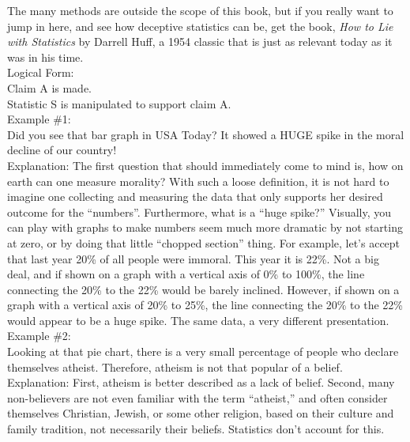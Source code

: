 \documentclass[a4paper,12pt,single,pdftex]{scrartcl}
\begin{document}
    
      The many methods are outside the scope of this book, but if you really want to jump in here, and see how deceptive statistics can be, get the book, {\it How to Lie with Statistics} by Darrell Huff, a 1954 classic that is just as relevant today as it was in his time.
    \\

    
      Logical Form:
    \\

    
      Claim A is made.
    \\

    
      Statistic S is manipulated to support claim A.
    \\

    
      Example \#1:
    \\

    
      Did you see that bar graph in USA Today?  It showed a HUGE spike in the moral decline of our country!
    \\

    
      Explanation: The first question that should immediately come to mind is, how on earth can one measure morality?  With such a loose definition, it is not hard to imagine one collecting and measuring the data that only supports her desired outcome for the “numbers”.  Furthermore, what is a “huge spike?”  Visually, you can play with graphs to make numbers seem much more dramatic by not starting at zero, or by doing that little “chopped section” thing.  For example, let’s accept that last year 20\% of all people were immoral.  This year it is 22\%.  Not a big deal, and if shown on a graph with a vertical axis of 0\% to 100\%, the line connecting the 20\% to the 22\% would be barely inclined.  However, if shown on a graph with a vertical axis of 20\% to 25\%, the line connecting the 20\% to the 22\% would appear to be a huge spike. The same data, a very different presentation.
    \\

    
      Example \#2:
    \\

    
      Looking at that pie chart, there is a very small percentage of people who declare themselves atheist.  Therefore, atheism is not that popular of a belief.
    \\

    
      Explanation: First, atheism is better described as a lack of belief.  Second, many non-believers are not even familiar with the term “atheist,” and often consider themselves Christian, Jewish, or some other religion, based on their culture and family tradition, not necessarily their beliefs.  Statistics don’t account for this.
    \\
\end{document}
